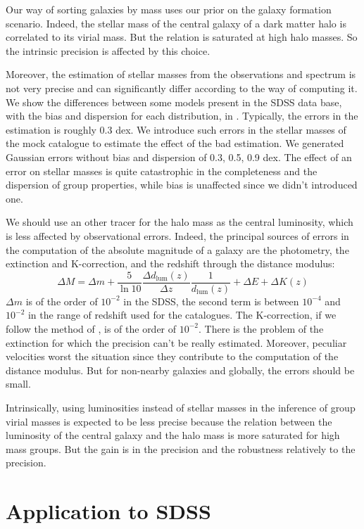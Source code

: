 Our way of sorting galaxies by mass uses our prior on the galaxy formation
scenario. Indeed, the stellar mass of the central galaxy of a dark matter halo
is correlated to its virial mass. But the relation is saturated at high halo
masses. So the intrinsic precision is affected by this choice.

Moreover, the estimation of stellar masses from the observations and spectrum
is not very precise and can significantly differ according to the way of
computing it. We show the differences between some models present in the SDSS
data base, with the bias and dispersion for each distribution, in
. Typically, the errors in the estimation is roughly 0.3
dex. We introduce such errors in the stellar masses of the mock catalogue to
estimate the effect of the bad estimation. We generated Gaussian errors without
bias and dispersion of 0.3, 0.5, 0.9 dex. The effect of an error on stellar
masses is quite catastrophic in the completeness and the dispersion of group
properties, while bias is unaffected since we didn't introduced one.

We should use an other tracer for the halo mass as the central luminosity,
which is less affected by observational errors. Indeed, the principal
sources of errors in the computation of the absolute magnitude of a galaxy
are the photometry, the extinction and K-correction, and the redshift
through the distance modulus:
%
\begin{equation}
    \Delta M=\Delta m + \frac{5}{\ln{10}}
    \frac{\Delta d_\mathrm{lum} \left(z\right)}{\Delta z}
    \frac{1}{d_\mathrm{lum} \left(z\right)} + \Delta E + \Delta K\left(z\right)
\end{equation}
%
$\Delta m$ is of the order of $10^{-2}$ in the SDSS, the second term is
between $10^{-4}$ and $10^{-2}$ in the range of redshift used for the
catalogues. The K-correction, if we follow the method of
\citet{Chilingarian+10}, is of the order of $10^{-2}$. There is the problem
of the extinction for which the precision can't be really estimated.
Moreover, peculiar velocities worst the situation since they contribute to
the computation of the distance modulus. But for non-nearby galaxies and
globally, the errors should be small.

Intrinsically, using luminosities instead of stellar masses in the inference
of group virial masses is expected to be less precise because the relation
between the luminosity of the central galaxy and the halo mass is more
saturated for high mass groups. But the gain is in the precision and the
robustness relatively to the precision.

\section{Application to SDSS}
\label{sec:application_to_sdss}

